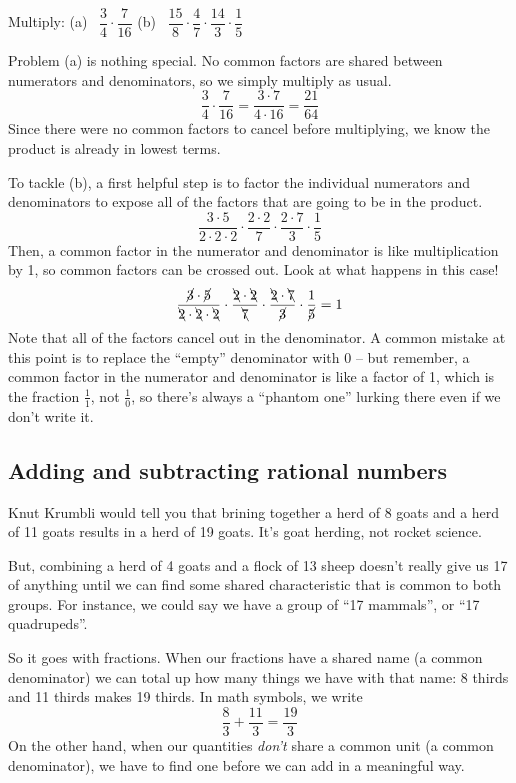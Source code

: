 \begin{boxex}
Multiply: (a)~ $\dfrac{3}{4} \cdot \dfrac{7}{16}$ \qquad (b)~ $\dfrac{15}{8}\cdot\dfrac{4}{7}\cdot\dfrac{14}{3}\cdot\dfrac{1}{5}$

Problem (a) is nothing special. No common factors are shared between numerators and denominators, so we simply multiply as usual.\[\frac{3}{4} \cdot \frac{7}{16} = \frac{3 \cdot 7}{4 \cdot 16} = \frac{21}{64}\] Since there were no common factors to cancel before multiplying, we know the product is already in lowest terms.

To tackle (b), a first helpful step is to factor the individual numerators and denominators to expose all of the factors that are going to be in the product. \[\frac{3\cdot 5}{2 \cdot 2 \cdot 2} \cdot \frac{2 \cdot 2}{7} \cdot \frac{2 \cdot 7}{3} \cdot \frac{1}{5}\]
Then, a common factor in the numerator and denominator is like multiplication by 1, so common factors can be crossed out. Look at what happens in this case!
\[\frac{\cancel{3}\cdot \cancel{5}}{\bcancel{2} \cdot \bcancel{2} \cdot \bcancel{2}} \cdot \frac{\bcancel{2} \cdot \bcancel{2}}{\bcancel{7}} \cdot \frac{\bcancel{2} \cdot \bcancel{7}}{\cancel{3}} \cdot \frac{1}{\cancel{5}} = 1\]
Note that all of the factors cancel out in the denominator. A common mistake at this point is to replace the ``empty'' denominator with 0 -- but remember, a common factor in the numerator and denominator is like a factor of 1, which is the fraction $\frac{1}{1}$, not $\frac{1}{0}$, so there's always a ``phantom one'' lurking there even if we don't write it.
\end{boxex}

\subsection{Adding and subtracting rational numbers}

Knut Krumbli would tell you that brining together a herd of 8 goats and a herd of 11 goats results in a herd of 19 goats. It's goat herding, not rocket science.

But, combining a herd of 4 goats and a flock of 13 sheep doesn't really give us 17 of anything until we can find some shared characteristic that is common to both groups. For instance, we could say we have a group of ``17 mammals'', or ``17 quadrupeds''.

So it goes with fractions. When our fractions have a shared name (a common denominator) we can total up how many things we have with that name: 8 thirds and 11 thirds makes 19 thirds. In math symbols, we write
\[\frac{8}{3} + \frac{11}{3} = \frac{19}{3}\]
On the other hand, when our quantities \textit{don't} share a common unit (a common denominator), we have to find one before we can add in a meaningful way.

